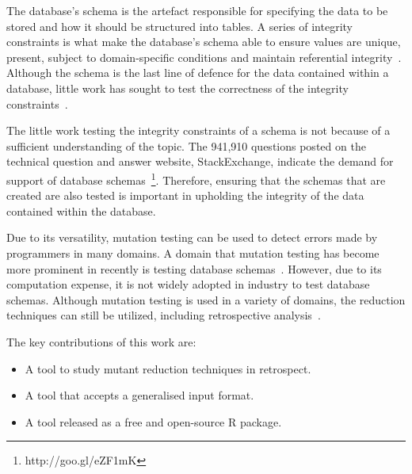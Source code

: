 The database's schema is the artefact responsible for specifying the data to be stored and how it should be structured
into tables. A series of integrity constraints is what make the database's schema able to ensure values are unique,
present, subject to domain-specific conditions and maintain referential integrity~\cite{mcminn2016virtual}.  Although
the schema is the last line of defence for the data contained within a database, little work has sought to test the
correctness of the integrity constraints~\cite{mcminn2015effectiveness}.




The little work testing the integrity constraints of a schema is not because of a sufficient understanding of the topic.
The 941,910 questions posted on the technical question and answer website, StackExchange, indicate the demand for
support of database schemas~\footnote{http://goo.gl/eZF1mK}. Therefore, ensuring that the schemas that are created are
also tested is important in upholding the integrity of the data contained within the database.

Due to its versatility, mutation testing can be used to detect errors made by programmers in many domains.  A domain
that mutation testing has become more prominent in recently is testing database schemas~\cite{mcminn2016virtual,
mcminn2015effectiveness, wright2013efficient}. However, due to its computation expense, it is not widely adopted in
industry to test database schemas.  Although mutation testing is used in a variety of domains, the reduction techniques
can still be utilized, including retrospective analysis~\cite{jia2011analysis, wong1995reducing, offutt1993experimental,
offutt2001mutation}.

The key contributions of this work are:

    \begin{itemize}
        \item A tool to study mutant reduction techniques in retrospect.
        \item A tool that accepts a generalised input format.
        \item A tool released as a free and open-source R package.
    \end{itemize}
